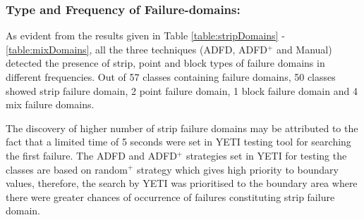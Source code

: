 



\subsubsection{Type and Frequency of Failure-domains:}
As evident from the results given in Table \ref{table:stripDomains} - \ref{table:mixDomains}, all the three techniques (ADFD, ADFD$^+$ and Manual) detected the presence of strip, point and block types of failure domains in different frequencies. Out of 57 classes containing failure domains, 50 classes showed strip failure domain, 2 point failure domain, 1 block failure domain and 4 mix failure domains.  

The discovery of higher number of strip failure domains may be attributed to the fact that a limited time of 5 seconds were set in YETI testing tool for searching the first failure. The ADFD and ADFD$^+$ strategies set in YETI for testing the classes are based on random$^+$ strategy which gives high priority to boundary values, therefore, the search by YETI was prioritised to the boundary area where there were greater chances of occurrence of failures constituting strip failure domain.


